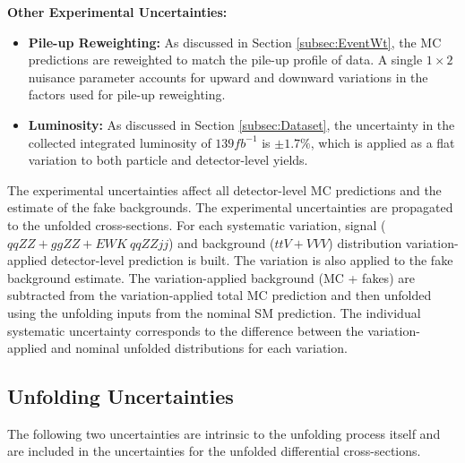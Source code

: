 \textbf{Other Experimental Uncertainties: }
\begin{itemize}
    \item{\textbf{Pile-up Reweighting:} As discussed in Section \ref{subsec:EventWt}, the MC predictions are reweighted to match the pile-up profile of data. A single $1\times2$ nuisance parameter accounts for upward and downward variations in the factors used for pile-up reweighting. }
    \item{\textbf{Luminosity:} As discussed in Section \ref{subsec:Dataset}, the uncertainty in the collected integrated luminosity of $139 fb^{-1}$ is $\pm1.7\%$, which is applied as a flat variation to both particle and detector-level yields. } 
\end{itemize}

The experimental uncertainties affect all detector-level MC predictions and the estimate of the fake backgrounds. The experimental uncertainties are propagated to the unfolded cross-sections. For each systematic variation, signal ($qqZZ+ggZZ+EWK~qqZZjj$) and background ($ttV+VVV$) distribution variation-applied detector-level prediction is built. The variation is also applied to the fake background estimate. The variation-applied background (MC + fakes) are subtracted from the variation-applied total MC prediction and then unfolded using the unfolding inputs from the nominal SM prediction. The individual systematic uncertainty corresponds to the difference between the variation-applied and nominal unfolded distributions for each variation.  

\subsection{Unfolding Uncertainties}
\label{subsec:UnfoldingUnc}
The following two uncertainties are intrinsic to the unfolding process itself and are included in the uncertainties for the unfolded differential cross-sections.


